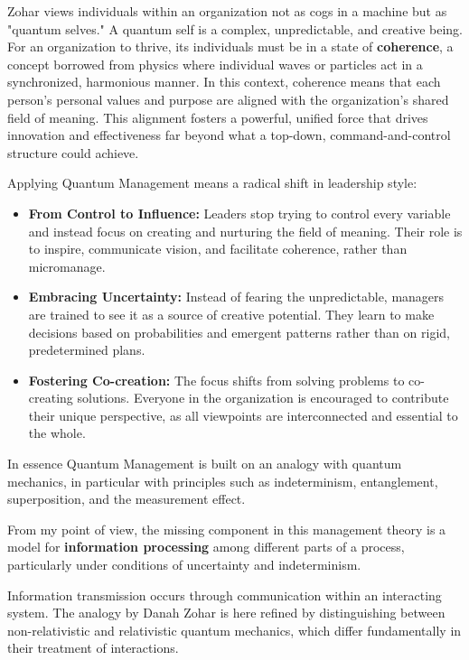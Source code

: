 \documentclass{article}
\begin{document}
Zohar views individuals within an organization not as cogs in a machine but as "quantum selves." A quantum self is a complex, unpredictable, and creative being. For an organization to thrive, its individuals must be in a state of \textbf{coherence}, a concept borrowed from physics where individual waves or particles act in a synchronized, harmonious manner. In this context, coherence means that each person's personal values and purpose are aligned with the organization's shared field of meaning. This alignment fosters a powerful, unified force that drives innovation and effectiveness far beyond what a top-down, command-and-control structure could achieve.

Applying Quantum Management means a radical shift in leadership style:

\begin{itemize}
    \item \textbf{From Control to Influence:} Leaders stop trying to control every variable and instead focus on creating and nurturing the field of meaning. Their role is to inspire, communicate vision, and facilitate coherence, rather than micromanage.
    \item \textbf{Embracing Uncertainty:} Instead of fearing the unpredictable, managers are trained to see it as a source of creative potential. They learn to make decisions based on probabilities and emergent patterns rather than on rigid, predetermined plans.
    \item \textbf{Fostering Co-creation:} The focus shifts from solving problems to co-creating solutions. Everyone in the organization is encouraged to contribute their unique perspective, as all viewpoints are interconnected and essential to the whole.
\end{itemize}


In essence Quantum Management is built on an analogy with quantum mechanics, in particular with principles such as indeterminism, entanglement, superposition, and the measurement effect. 

From my point of view, the missing component in this management theory is a model for \textbf{information processing} among different parts of a process, particularly under conditions of uncertainty and indeterminism.

Information transmission occurs through communication within an interacting system. The analogy by Danah Zohar is here refined by distinguishing between non-relativistic and relativistic quantum mechanics, which differ fundamentally in their treatment of interactions. 
\end{document}
